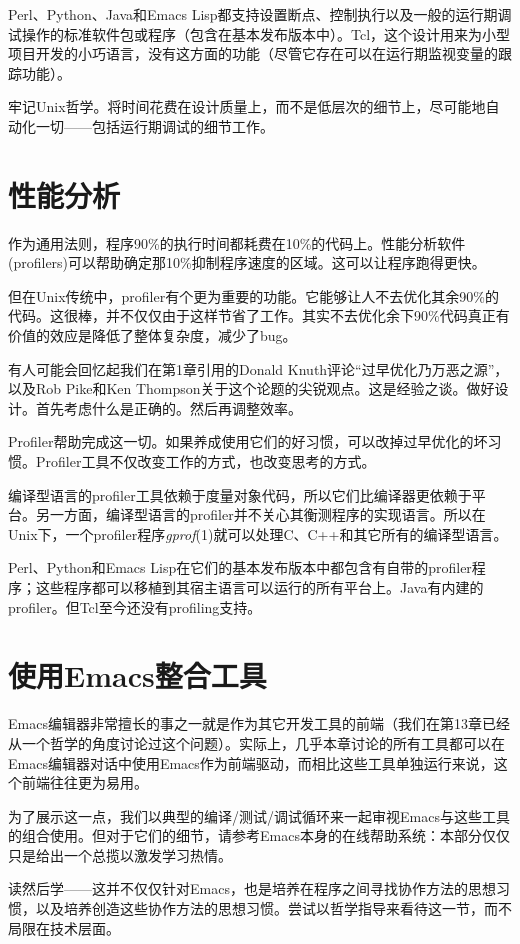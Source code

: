 \documentclass[12pt,oneside]{book}
\begin{document}
\begin{common-format}
Perl、Python、Java和Emacs Lisp都支持设置断点、控制执行以及一般的运行期调试操作的标准软件包或程序（包含在基本发布版本中）。Tcl，这个设计用来为小型项目开发的小巧语言，没有这方面的功能（尽管它存在可以在运行期监视变量的跟踪功能）。

牢记Unix哲学。将时间花费在设计质量上，而不是低层次的细节上，尽可能地自动化一切——包括运行期调试的细节工作。


\section{性能分析}
作为通用法则，程序90\%{}的执行时间都耗费在10\%{}的代码上。性能分析软件(profilers)可以帮助确定那10\%{}抑制程序速度的区域。这可以让程序跑得更快。

但在Unix传统中，profiler有个更为重要的功能。它能够让人不去优化其余90\%{}的代码。这很棒，并不仅仅由于这样节省了工作。其实不去优化余下90\%{}代码真正有价值的效应是降低了整体复杂度，减少了bug。

有人可能会回忆起我们在第1章引用的Donald Knuth评论“过早优化乃万恶之源”，以及Rob Pike和Ken Thompson关于这个论题的尖锐观点。这是经验之谈。做好设计。首先考虑什么是正确的。然后再调整效率。

Profiler帮助完成这一切。如果养成使用它们的好习惯，可以改掉过早优化的坏习惯。Profiler工具不仅改变工作的方式，也改变思考的方式。

编译型语言的profiler工具依赖于度量对象代码，所以它们比编译器更依赖于平台。另一方面，编译型语言的profiler并不关心其衡测程序的实现语言。所以在Unix下，一个profiler程序\textit{gprof}(1)就可以处理C、C++和其它所有的编译型语言。

Perl、Python和Emacs Lisp在它们的基本发布版本中都包含有自带的profiler程序；这些程序都可以移植到其宿主语言可以运行的所有平台上。Java有内建的profiler。但Tcl至今还没有profiling支持。

\section{使用Emacs整合工具}
Emacs编辑器非常擅长的事之一就是作为其它开发工具的前端（我们在第13章已经从一个哲学的角度讨论过这个问题）。实际上，几乎本章讨论的所有工具都可以在Emacs编辑器对话中使用Emacs作为前端驱动，而相比这些工具单独运行来说，这个前端往往更为易用。

为了展示这一点，我们以典型的编译/测试/调试循环来一起审视Emacs与这些工具的组合使用。但对于它们的细节，请参考Emacs本身的在线帮助系统：本部分仅仅只是给出一个总揽以激发学习热情。

读然后学——这并不仅仅针对Emacs，也是培养在程序之间寻找协作方法的思想习惯，以及培养创造这些协作方法的思想习惯。尝试以哲学指导来看待这一节，而不局限在技术层面。



\end{common-format}
\end{document}
